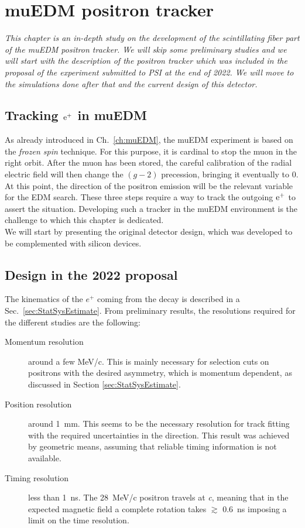 \chapter{muEDM positron tracker}
\label{ch:muEDM:tracker}
\begin{refsection}
{\itshape This chapter is an in-depth study on the development of the scintillating fiber part of the muEDM positron tracker. 
We will skip some preliminary studies and we will start with the description of the positron tracker which was included in the proposal of the experiment submitted to PSI at the end of 2022. We will move to the simulations done after that and the current design of this detector.}

\section{Tracking $\text{e}^+$ in muEDM}
    As already introduced in Ch.~\ref{ch:muEDM}, the muEDM experiment is based on the \textit{frozen spin} technique.
    For this purpose, it is cardinal to stop the muon in the right orbit. 
    After the muon has been stored, the careful calibration of the radial electric field will then change the $(g-2)$ precession, bringing it eventually to 0.
    At this point, the direction of the positron emission will be the relevant variable for the EDM search.
    These three steps require a way to track the outgoing $\text{e}^+$ to assert the situation.
    Developing such a tracker in the muEDM environment is the challenge to which this chapter is dedicated.\\

    \noindent
    We will start by presenting the original detector design, which was developed to be complemented with silicon devices.

\section{Design in the 2022 proposal}
    The kinematics of the $e^+$ coming from the decay is described in a Sec.~\ref{sec:StatSysEstimate}.
    From preliminary results, the resolutions required for the different studies are the following:
    \begin{description}
        \item[Momentum resolution] around a few MeV/c. This is mainly necessary for selection cuts on positrons with the desired asymmetry, which is momentum dependent, as discussed in Section \ref{sec:StatSysEstimate}.
        \item[Position resolution] around \SI{1}{mm}. This seems to be the necessary resolution for track fitting with the required uncertainties in the direction. 
        This result was achieved by geometric means, assuming that reliable timing information is not available. 
        \item[Timing resolution] less than \SI{1}{ns}. The \SI{28}{MeV/c} positron travels at \textit{c}, meaning that in the expected magnetic field a complete rotation takes $\gtrsim$ \SI{0.6}{ns} imposing a limit on the time resolution. 
    \end{description}
    

\end{refsection}
